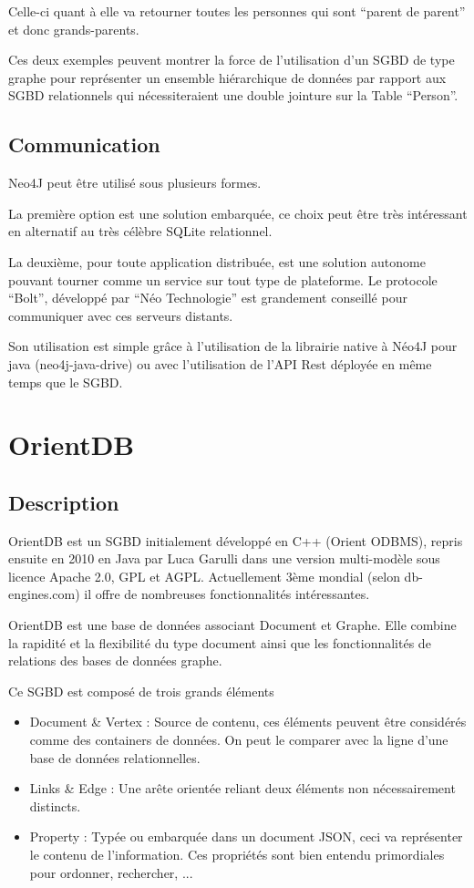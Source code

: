 \documentclass[a4paper,fleqn,12pt]{report}
\begin{document}
Celle-ci quant à elle va retourner toutes les personnes qui sont \enquote{parent de parent} et donc grands-parents. 

Ces deux exemples peuvent montrer la force de l’utilisation d’un SGBD de type graphe pour représenter un ensemble hiérarchique de données par rapport aux SGBD relationnels qui nécessiteraient une double jointure sur la Table \enquote{Person}.

\subsection{Communication}

Neo4J peut être utilisé sous plusieurs formes.

La première option est une solution embarquée, ce choix peut être très intéressant en alternatif au très célèbre SQLite relationnel.

La deuxième, pour toute application distribuée, est une solution autonome pouvant tourner comme un service sur tout type de plateforme. Le protocole \enquote{Bolt}, développé par \enquote{Néo Technologie} est grandement conseillé pour communiquer avec ces serveurs distants.

Son utilisation est simple grâce à l’utilisation de la librairie native à Néo4J pour java (neo4j-java-drive) ou avec l’utilisation de l’API Rest déployée en même temps que le SGBD.

\section{OrientDB}

\subsection{Description}

OrientDB est un SGBD initialement développé en C++ (Orient ODBMS), repris ensuite en 2010 en Java par Luca Garulli dans une version multi-modèle sous licence Apache 2.0, GPL et AGPL. Actuellement 3ème mondial (selon db-engines.com) il offre de nombreuses fonctionnalités intéressantes.\cite{OrientDBSite}

OrientDB est une base de données associant Document et Graphe. Elle combine la rapidité et la flexibilité du type document ainsi que les fonctionnalités de relations des bases de données graphe.

Ce SGBD est composé de trois grands éléments 

\begin{itemize}
\item Document \& Vertex : Source de contenu, ces éléments peuvent être considérés comme des containers de données. On peut le comparer avec la ligne d'une base de données relationnelles.
\item Links \& Edge : Une arête orientée reliant deux éléments non nécessairement distincts.
\item Property : Typée ou embarquée dans un document JSON, ceci va représenter le contenu de l'information. Ces propriétés sont bien entendu primordiales pour ordonner, rechercher, ...
\end{itemize}
\end{document}
